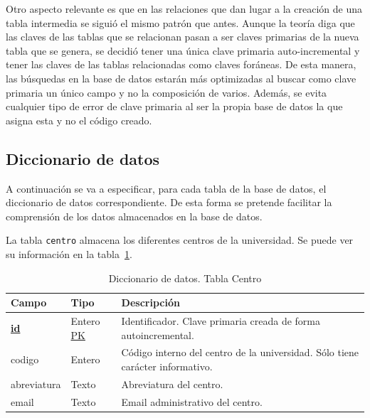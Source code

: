 Otro aspecto relevante es que en las relaciones que dan lugar a la creación de una tabla intermedia se siguió el mismo patrón que antes. 
Aunque la teoría diga que las claves de las tablas que se relacionan pasan a ser claves primarias de la nueva tabla que se genera, se decidió tener una única clave primaria auto-incremental y tener las claves de las tablas relacionadas como claves foráneas.
De esta manera, las búsquedas en la base de datos estarán más optimizadas al buscar como clave primaria un único campo y no la composición de varios.
Además, se evita cualquier tipo de error de clave primaria al ser la propia base de datos la que asigna esta y no el código creado.


\subsection{Diccionario de datos}
A continuación se va a especificar, para cada tabla de la base de datos, el diccionario de datos correspondiente.
De esta forma se pretende facilitar la comprensión de los datos almacenados en la base de datos.

La tabla \texttt{centro} almacena los diferentes centros de la universidad. 
Se puede ver su información en la tabla~\ref{tab:diccionario_centro}.
\begin{table}
\centering
  \begin{tabular}{l p{} p{}}
    \toprule
    \textbf{Campo} & \textbf{Tipo} & \textbf{Descripción}\\
    \midrule
    \textbf{\underline{id}} & Entero \underline{PK} & Identificador. Clave primaria creada de forma autoincremental. \\ \addlinespace
    codigo & Entero & Código interno del centro de la universidad. Sólo tiene carácter informativo. \\ \addlinespace 
    abreviatura & Texto & Abreviatura del centro. \\ \addlinespace
    email & Texto & Email administrativo del centro. \\
    \bottomrule
  \end{tabular}
  \caption{Diccionario de datos. Tabla Centro}
  \label{tab:diccionario_centro}
\end{table}

